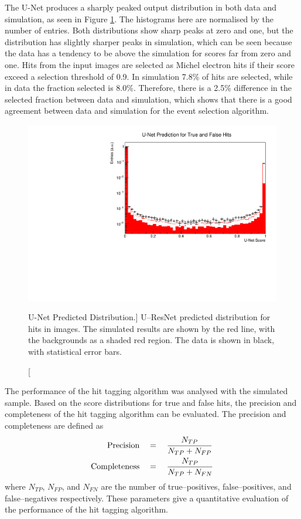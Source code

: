 The U-Net produces a sharply peaked output distribution in both data and
simulation, as seen in Figure \ref{fig:unet_pred_data}. The histograms here are
normalised by the number of entries. Both distributions show sharp peaks at zero
and one, but the distribution has slightly sharper peaks in simulation, which 
can be seen because the data has a tendency to be above the simulation for
scores far from zero and one. Hits from the input images are selected as 
Michel electron hits if their score exceed a selection threshold of 0.9. In 
simulation 7.8\% of hits are selected, while in data the fraction selected is 
8.0\%. Therefore, there is a 2.5\% difference in the selected fraction between 
data and simulation, which shows that there is a good agreement between data and
simulation for the event selection algorithm.
\begin{figure}
	\centering
	\includegraphics[width=\textwidth]{figures/unet_pred_data.pdf}
	\caption
	[U-Net Predicted Distribution.]
	{U--ResNet predicted distribution for hits in images. The simulated results are
	shown by the red line, with the backgrounds as a shaded red region. The data 
	is shown in black, with statistical error bars.}
	\label{fig:unet_pred_data}
\end{figure}

The performance of the hit tagging algorithm was analysed with the simulated
sample. Based on the score distributions for true and false hits, the precision 
and completeness of the hit tagging algorithm can be evaluated. The precision 
and completeness are defined as 
\begin{align}
	\mbox{Precision} \quad &= \quad  \frac{N_{TP}}{N_{TP} + N_{FP}} \\
	\vspace{2mm}
	\mbox{Completeness} \quad &= \quad \frac{N_{TP}}{N_{TP} + N_{FN}}
\end{align}
where $N_{TP}$, $N_{FP}$, and $N_{FN}$ are the number of true--positives,
false--positives, and false--negatives respectively. These parameters give a
quantitative evaluation of the performance of the hit tagging algorithm.

